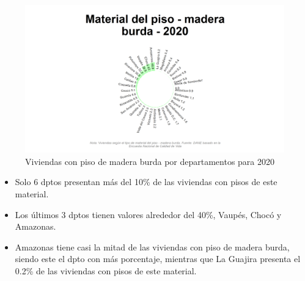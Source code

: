     \begin{figure}[H]
        \caption{Viviendas con piso de madera burda por departamentos para 2020 \label{map_result_2} }
        \begin{center}
        \includegraphics[width=\textwidth,keepaspectratio]{img/var_175_static.png}
        \end{center}
    \end{figure}
            \begin{itemize}
                    \item Solo 6 dptos presentan más del 10\% de las viviendas con pisos de este material.
                    \item Los últimos 3 dptos tienen valores alrededor del 40\%, Vaupés, Chocó y Amazonas.
                    \item Amazonas tiene casi la mitad de las viviendas con piso de madera burda, siendo este el dpto con más porcentaje, mientras que La Guajira presenta el 0.2\% de las viviendas con pisos de este material.
                    \end{itemize}

